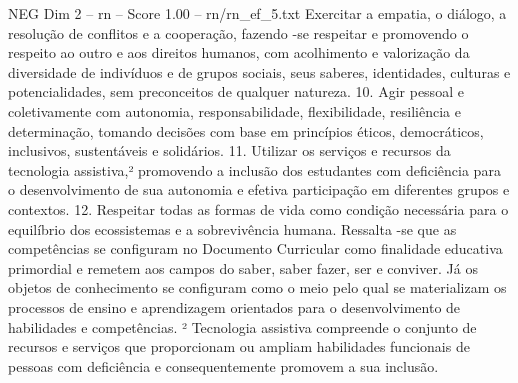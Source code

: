 \begin{textsample}{NEG Dim 2 – rn – Score 1.00 – rn/rn\_ef\_5.txt}
Exercitar a empatia, o diálogo, a resolução de conflitos e a cooperação, fazendo -se respeitar e promovendo o respeito ao outro e aos direitos humanos, com acolhimento e valorização da diversidade de indivíduos e de grupos sociais, seus saberes, identidades, culturas e potencialidades, sem preconceitos de qualquer natureza. 10.
Agir pessoal e coletivamente com autonomia, responsabilidade, flexibilidade, resiliência e determinação, tomando decisões com base em princípios éticos, democráticos, inclusivos, sustentáveis e solidários. 11.
Utilizar os serviços e recursos da tecnologia assistiva,² promovendo a inclusão dos estudantes com deficiência para o desenvolvimento de sua autonomia e efetiva participação em diferentes grupos e contextos. 12.
Respeitar todas as formas de vida como condição necessária para o equilíbrio dos ecossistemas e a sobrevivência humana.
Ressalta -se que as competências se configuram no Documento Curricular como finalidade educativa primordial e remetem aos campos do saber, saber fazer, ser e conviver.
Já os objetos de conhecimento se configuram como o meio pelo qual se materializam os processos de ensino e aprendizagem orientados para o desenvolvimento de habilidades e competências. ² Tecnologia assistiva compreende o conjunto de recursos e serviços que proporcionam ou ampliam habilidades funcionais de pessoas com deficiência e consequentemente promovem a sua inclusão.

\end{textsample}
